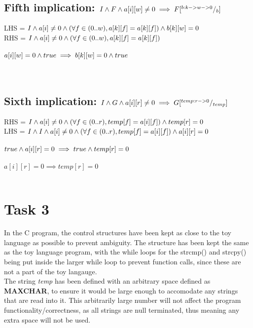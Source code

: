 \documentclass [a4paper, 12pt, fleqn]  {article}
\newcommand{\remark}[1]{{\sffamily\color{blue}{#1}}}
\begin{document}
\subsection{Fifth implication: $ I \wedge F \wedge a[i][w] \neq 0 \implies F [^{b: k -> w -> 0}/_{b}]  $}
LHS = $ I \wedge a[i] \neq 0 \wedge (\forall f \in (0..w), a[k][f] = a[k][f]) \wedge b[k][w] = 0 $ \\
RHS = $  I \wedge a[i] \neq 0 \wedge (\forall f \in (0..w), a[k][f] = a[k][f]) $ \\
\remark { Expanded both the LHS and RHS to show similar items} \\
$ a[i][w] = 0 \wedge true \implies b[k][w] = 0 \wedge true $ \\
\remark { Removed common elements from both sides} \\
\remark {  Since in F b[k][w] = a[i][w], a[i][w] = 0 does imply that b[k][w] = 0. Therefore, the implication is true  } \\

\subsection{Sixth implication: $ I \wedge G \wedge a[i][r] \neq 0 \implies G [^{temp: r ->  0}/_{temp}] $}
RHS = $ I \wedge a[i] \neq 0 \wedge (\forall f \in (0..r), temp[f] = a[i][f]) \wedge temp[r] = 0 $ \\
LHS = $ I \wedge I \wedge a[i] \neq 0 \wedge (\forall f \in (0..r), temp[f] = a[i][f]) \wedge a[i][r] = 0$ \\
\remark{  Expand out both LHS and RHS  } \\
$ true \wedge a[i][r] = 0 \implies true \wedge temp[r] = 0 $ \\
\remark { Removed common elements from both sides  } \\
$ a[i][r] = 0 \implies temp[r] = 0 $ \\
\remark{ Since in G temp[f] = a[i][f] and both indexes are set to r, this implication is therefore true} \\

\newpage

\section{Task 3}
\label{sec:task-3}



In the C program, the control structures have been kept as close to the toy language as possible to prevent ambiguity. The structure has been kept the same as the toy language program, with the while loops for the strcmp() and strcpy() being put inside the larger while loop to prevent function calls, since these are not a part of the toy langauge. \\
The string \textit{temp} has been defined with an arbitrary space defined as \textbf{MAXCHAR}, to ensure it would be large enough to accomodate any strings that are read into it. This arbitrarily large number will not affect the program functionality/correctness, as all strings are null terminated, thus meaning any extra space will not be used. 

\end{document}
